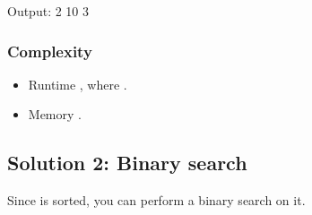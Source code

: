 \documentclass[letterpaper,12pt,english]{book}
\begin{document}
\begin{sphinxVerbatim}[commandchars=\\\{\}]
\end{sphinxVerbatim}

\begin{sphinxVerbatim}[commandchars=\\\{\}]
Output:
2
10
3
\end{sphinxVerbatim}


\subsubsection{Complexity}
\label{\detokenize{Binary_Search/540_Single_Element_in_a_Sorted_Array:complexity}}\begin{itemize}
\item {} 
\sphinxAtStartPar
Runtime , where .

\item {} 
\sphinxAtStartPar
Memory .

\end{itemize}


\subsection{Solution 2: Binary search}
\label{\detokenize{Binary_Search/540_Single_Element_in_a_Sorted_Array:solution-2-binary-search}}
\sphinxAtStartPar
Since  is sorted, you can perform a binary search on it.
\end{document}
